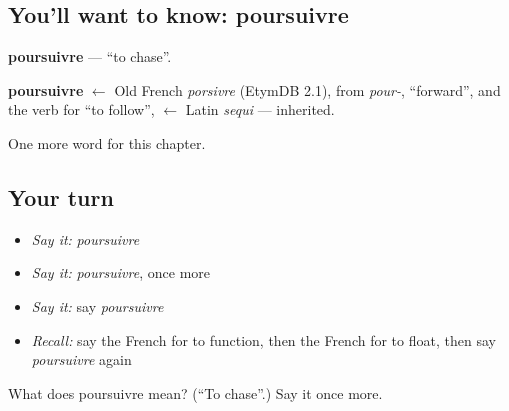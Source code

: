 \subsection*{You'll want to know: poursuivre}
\textbf{poursuivre} — \textquotedblleft{}to chase\textquotedblright{}.

\begin{cousinweb}
\textbf{poursuivre} $\leftarrow$ Old French \emph{porsivre} (EtymDB 2.1), from \emph{pour-}, \textquotedblleft{}forward\textquotedblright{}, and the verb for \textquotedblleft{}to follow\textquotedblright{}, $\leftarrow$ Latin \emph{sequi} — inherited.
\end{cousinweb}

\begin{grammarlens}[title={What you've built}]
One more word for this chapter.
\end{grammarlens}

\subsection*{Your turn}
\begin{itemize}
\raggedright
  \item \emph{Say it:} \emph{poursuivre}
  \item \emph{Say it:} \emph{poursuivre}, once more
  \item \emph{Say it:} say \emph{poursuivre}
  \item \emph{Recall:} say the French for to function, then the French for to float, then say \emph{poursuivre} again
\end{itemize}

\begin{tcolorbox}[breakable,colback=teal!4,colframe=teal!35!black,title={Before you move on}]
What does poursuivre mean? (\textquotedblleft{}To chase\textquotedblright{}.) Say it once more.
\end{tcolorbox}
